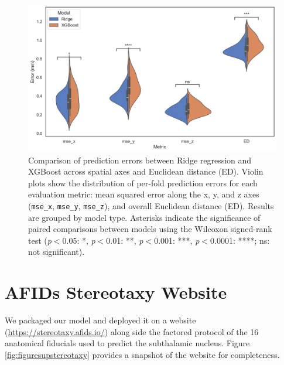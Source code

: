 \begin{figure}[hbt!]
    \centering
    \includegraphics[width=1\linewidth]{figs/figuresupridgevsxgboost.png}
    \caption{Comparison of prediction errors between Ridge regression and XGBoost across spatial axes and Euclidean distance (ED). Violin plots show the distribution of per-fold prediction errors for each evaluation metric: mean squared error along the x, y, and z axes (\texttt{mse\_x}, \texttt{mse\_y}, \texttt{mse\_z}), and overall Euclidean distance (ED). Results are grouped by model type. Asterisks indicate the significance of paired comparisons between models using the Wilcoxon signed-rank test (\textit{p}\(<\)0.05: *, \textit{p}\(<\)0.01: **, \textit{p}\(<\)0.001: ***, \textit{p}\(<\)0.0001: ****; ns: not significant).}
    \label{fig:figuresupridgevsxgboost}
\end{figure}

\newpage
\section{AFIDs Stereotaxy Website}\label{app:stereotaxy}
We packaged our model and deployed it on a website (\url{https://stereotaxy.afids.io/}) along side the factored protocol of the 16 anatomical fiducials used to predict the subthalamic nucleus. Figure \ref{fig:figuresupstereotaxy} provides a snapshot of the website for completeness. 

